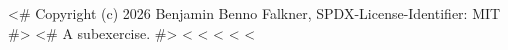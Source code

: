 <# Copyright (c) 2026 Benjamin Benno Falkner, SPDX-License-Identifier: MIT #>
<# A subexercise. #>
<%
<%
\newpage
<%
\subexercise<%
<%
